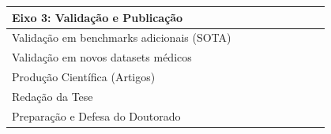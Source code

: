 \begin{table}[h!]
{\begin{tabular}{|l|c|c|c|c|c|c|c|c|}
\hline
\textbf{Eixo 3: Validação e Publicação} & & & & & & & & \\
\hline
Validação em benchmarks adicionais (SOTA) & & & & \cellcolor{gray!40} & \cellcolor{gray!40} & & & \\
\hline
Validação em novos datasets médicos & & & & & \cellcolor{gray!40} & \cellcolor{gray!40} & & \\
\hline
Produção Científica (Artigos) & & & \cellcolor{gray!40} & \cellcolor{gray!40} & \cellcolor{gray!40} & \cellcolor{gray!40} & \cellcolor{gray!40} & \\
\hline
Redação da Tese & & & & & & \cellcolor{gray!40} & \cellcolor{gray!40} & \\
\hline
Preparação e Defesa do Doutorado & & & & & & & & \cellcolor[HTML]{B0E0B0} \\
\hline
\end{tabular}%
}
\end{table}